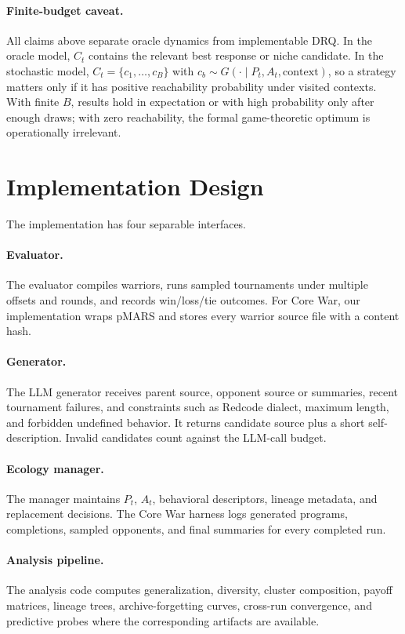 \documentclass[11pt]{article}
\begin{document}
\paragraph{Finite-budget caveat.}
All claims above separate oracle dynamics from implementable DRQ. In the oracle model, $C_t$ contains the relevant best response or niche candidate. In the stochastic model, $C_t=\{c_1,\ldots,c_B\}$ with $c_b\sim G(\cdot\mid P_t,A_t,\mathrm{context})$, so a strategy matters only if it has positive reachability probability under visited contexts. With finite $B$, results hold in expectation or with high probability only after enough draws; with zero reachability, the formal game-theoretic optimum is operationally irrelevant.

\section{Implementation Design}

The implementation has four separable interfaces.

\paragraph{Evaluator.}
The evaluator compiles warriors, runs sampled tournaments under multiple offsets and rounds, and records win/loss/tie outcomes. For Core War, our implementation wraps pMARS and stores every warrior source file with a content hash.

\paragraph{Generator.}
The LLM generator receives parent source, opponent source or summaries, recent tournament failures, and constraints such as Redcode dialect, maximum length, and forbidden undefined behavior. It returns candidate source plus a short self-description. Invalid candidates count against the LLM-call budget.

\paragraph{Ecology manager.}
The manager maintains $P_t$, $A_t$, behavioral descriptors, lineage metadata, and replacement decisions. The Core War harness logs generated programs, completions, sampled opponents, and final summaries for every completed run.

\paragraph{Analysis pipeline.}
The analysis code computes generalization, diversity, cluster composition, payoff matrices, lineage trees, archive-forgetting curves, cross-run convergence, and predictive probes where the corresponding artifacts are available.
\end{document}
